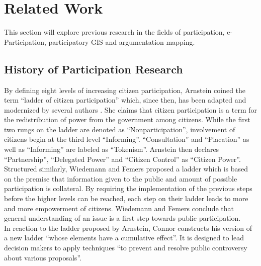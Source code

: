 \section{Related Work}
\label{chap:related_work}
This section will explore previous research in the fields of participation, e-Participation, participatory GIS and argumentation mapping.%



\subsection{History of Participation Research}
By defining eight levels of increasing citizen participation, Arnstein \cite{Arnstein1969_citizen_participation} coined the term ``ladder of citizen participation'' which, since then, has been adapted and modernized by several authors \cite{Connor1988_new_ladder,carver2003future,Collins2009_social_learning,you2009_participatory_map_based,Cai2009_spatial_annotation_deliberation,Macintosh2004_eParticipation_characterization,Schlossberg2005_PPGIS}. She claims that citizen participation is a term for the redistribution of power from the government among citizens. While the first two rungs on the ladder are denoted as ``Nonparticipation'', involvement of citizens begin at the third level ``Informing''. ``Consultation'' and ``Placation'' as well as ``Informing'' are labeled as ``Tokenism''. Arnstein then declares ``Partnership'', ``Delegated Power'' and ``Citizen Control'' as ``Citizen Power''.\\
Structured similarly, Wiedemann and Femers \cite{Wiedemann1993355} proposed a ladder which is based on the premise that information given to the public and amount of possible participation is collateral. By requiring the implementation of the previous steps before the higher levels can be reached, each step on their ladder leads to more and more empowerment of citizens. Wiedemann and Femers conclude that general understanding of an issue is a first step towards public participation.\\
In reaction to the ladder proposed by Arnstein, Connor \cite{Connor1988_new_ladder} constructs his version of a new ladder ``whose elements have a cumulative effect''. It is designed to lead decision makers to apply techniques ``to prevent and resolve public controversy about various proposals''. %

